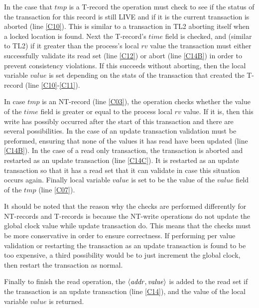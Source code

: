 In the case that $\mathit{tmp}$ is a T-record the operation must check to see
if the status of the transaction for this record is still LIVE and if it is
the current transaction is aborted (line \ref{C10}).
This is similar to a transaction in TL2 aborting itself when a locked location is found.
Next the T-record's $\mathit{time}$ field is checked, and (similar to TL2) if it 
greater than the process's local $\mathit{rv}$ value the transaction must
either successfully validate its read set (line \ref{C12}) or
abort (line \ref{C14B}) in order to prevent consistency violations.
If this succeeds without aborting, then the local variable $\mathit{value}$
is set depending on the stats of the transaction that created the T-record (line \ref{C10}-\ref{C11}).

In case $\mathit{tmp}$ is an 
NT-record (line \ref{C03}), the operation
checks whether the value of the $\mathit{time}$ field is
greater or equal to the process local $\mathit{rv}$ value.
If it is, then this write has possibly occurred after the start of this
transaction and there are several possibilities.
In the case of an update transaction validation must be preformed, ensuring
that none of the values it has read have been updated (line \ref{C14B}).
In the case of a read only transaction, the transaction
is aborted and restarted as an update transaction (line \ref{C14C}).
It is restarted as an update transaction so that it has a read set that it can validate
in case this situation occurs again.
Finally local variable $\mathit{value}$ is set to be the value
of the $\mathit{value}$ field of the $\mathit{tmp}$ (line \ref{C07}).

It should be noted that the reason why the checks are performed differently
for NT-records and T-records is because the NT-write operations do not
update the global clock value while update transaction do.
This means that the checks must be more conservative in order to ensure correctness.
If performing per value validation or restarting the transaction as an update transaction
is found to be too expensive, a third possibility would be to just increment the global
clock, then restart the transaction as normal.

Finally to finish the read operation, the $\left \langle \mathit{addr, value} \right \rangle $
is added to the read set if the transaction is an update transaction (line \ref{C14}),
and the value of the local variable $\mathit{value}$  is returned.







